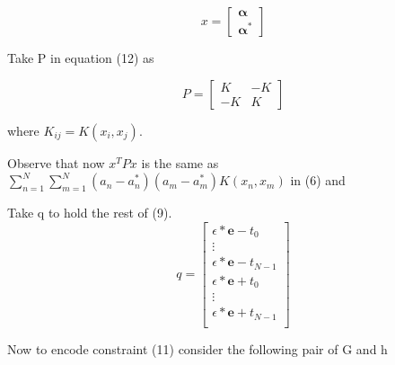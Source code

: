 \documentclass[12pt,twoside,notitlepage]{report}
\begin{document}
\[x =
  \begin{bmatrix}
    \bm{ \alpha} \\
    \bm{ \alpha^*}
  \end{bmatrix}
\]

Take P in equation (12) as 

\[P =
\begin{bmatrix}
       K & -K           \\
       -K & K            
     \end{bmatrix}
\]

where \(K_{ij} = K(x_i,x_j)\).

Observe that now \(x^T P x\) is the same as 
\(\sum_{n=1}^{N}\sum_{m=1}^{N}(a_n-a_n^*)(a_m-a_m^*)K(x_n,x_m)\) in (6) and 

Take q to hold the rest of (9).
\[q =
\begin{bmatrix}
  \epsilon*\mathbf{e}-t_0           \\
  \vdots                                     \\
  \epsilon*\mathbf{e}-t_{N-1}           \\
   \epsilon*\mathbf{e}+t_0           \\
   \vdots                           \\
  \epsilon*\mathbf{e}+t_{N-1}           \\
     \end{bmatrix}
\]

Now to encode constraint (11) consider the following pair of G and h
\end{document}
